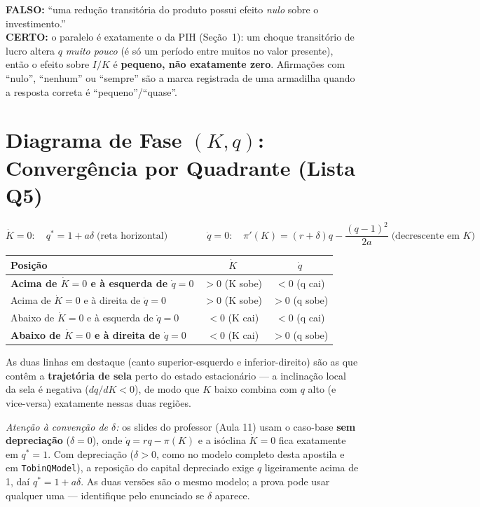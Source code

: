 \documentclass[12pt, a4paper]{article}
\begin{document}
\begin{armbox}[title={Armadilha (P2-2021 Q2-iii): choque transitório não é ``efeito nulo''}]
\textbf{FALSO:} ``uma redução transitória do produto possui efeito
\emph{nulo} sobre o investimento.'' \\
\textbf{CERTO:} o paralelo é exatamente o da PIH (Seção~1): um choque
transitório de lucro altera $q$ \emph{muito pouco} (é só um período entre
muitos no valor presente), então o efeito sobre $I/K$ é \textbf{pequeno,
não exatamente zero}. Afirmações com ``nulo'', ``nenhum'' ou ``sempre'' são
a marca registrada de uma armadilha quando a resposta correta é
``pequeno''/``quase''.
\end{armbox}

\section{Diagrama de Fase $(K,q)$: Convergência por Quadrante (Lista Q5)}

\begin{formulabox}[title={As duas isóclinas}]
\[
  \dot K=0: \quad q^*=1+a\delta \;\text{(reta horizontal)} \qquad\qquad
  \dot q=0: \quad \pi'(K) = (r+\delta)q - \frac{(q-1)^2}{2a} \;\text{(decrescente em $K$)}
\]
\end{formulabox}

\begin{fatorbox}[title={Mapa dos quatro quadrantes}]
\begin{center}
\begin{tabular}{lcc}
\toprule
Posição & $\dot K$ & $\dot q$ \\
\midrule
\textbf{Acima de $\dot K=0$ e à esquerda de $\dot q=0$} & $>0$ (K sobe) & $<0$ (q cai) \\
Acima de $\dot K=0$ e à direita de $\dot q=0$ & $>0$ (K sobe) & $>0$ (q sobe) \\
Abaixo de $\dot K=0$ e à esquerda de $\dot q=0$ & $<0$ (K cai) & $<0$ (q cai) \\
\textbf{Abaixo de $\dot K=0$ e à direita de $\dot q=0$} & $<0$ (K cai) & $>0$ (q sobe) \\
\bottomrule
\end{tabular}
\end{center}
As duas linhas em destaque (canto superior-esquerdo e inferior-direito) são
as que contêm a \textbf{trajetória de sela} perto do estado estacionário ---
a inclinação local da sela é negativa ($dq/dK<0$), de modo que $K$ baixo
combina com $q$ alto (e vice-versa) exatamente nessas duas regiões.

\smallskip
\noindent\textit{Atenção à convenção de $\delta$:} os slides do professor
(Aula 11) usam o caso-base \textbf{sem depreciação} ($\delta=0$), onde
$\dot q=rq-\pi(K)$ e a isóclina $\dot K=0$ fica exatamente em $q^*=1$. Com
depreciação ($\delta>0$, como no modelo completo desta apostila e em
\texttt{TobinQModel}), a reposição do capital depreciado exige $q$
ligeiramente acima de 1, daí $q^*=1+a\delta$. As duas versões são o mesmo
modelo; a prova pode usar qualquer uma --- identifique pelo enunciado se
$\delta$ aparece.
\end{fatorbox}
\end{document}
